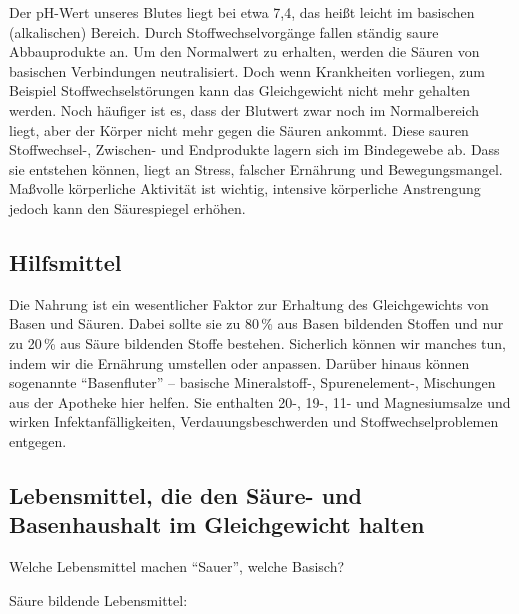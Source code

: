 Der pH-Wert unseres Blutes liegt bei etwa 7,4, das heißt leicht im
 basischen (alkalischen) Bereich. Durch Stoffwechselvorgänge
 fallen ständig saure Abbauprodukte an. Um den Normalwert
 zu erhalten, werden die Säuren von basischen Verbindungen neutralisiert.
 Doch wenn Krankheiten vorliegen, zum Beispiel Stoffwechselstörungen kann das
 Gleichgewicht nicht mehr gehalten werden.
 Noch häufiger ist es, dass der Blutwert zwar noch
 im Normalbereich liegt, aber der Körper nicht mehr gegen
 die Säuren ankommt. Diese sauren Stoffwechsel-, Zwischen-
 und Endprodukte lagern sich im Bindegewebe ab. Dass sie
 entstehen können, liegt an Stress, falscher Ernährung und Bewegungsmangel.
 Maßvolle körperliche Aktivität ist wichtig,
 intensive körperliche Anstrengung jedoch kann den Säurespiegel erhöhen.

\subsection{Hilfsmittel}
Die Nahrung ist ein wesentlicher Faktor zur Erhaltung des
 Gleichgewichts von Basen und Säuren. Dabei sollte sie zu
 80\,\% aus Basen bildenden Stoffen und nur zu 20\,\% aus Säure bildenden Stoffe bestehen.
 Sicherlich können wir manches tun, indem wir die Ernährung umstellen oder anpassen.
 Darüber hinaus können sogenannte \enquote{Basenfluter} --  basische
 Mineralstoff-, Spurenelement-, Mischungen aus der Apotheke
 hier helfen. Sie enthalten \acl{20}-, \acl{19}-, \acl{11}- und
 Magnesiumsalze und wirken Infektanfälligkeiten, Verdauungsbeschwerden und Stoffwechselproblemen entgegen.

\subsection{Lebensmittel, die den Säure- und Basenhaushalt im Gleichgewicht halten}
Welche Lebensmittel machen \enquote{Sauer}, welche Basisch?
\begin{description}
   \item[Säure bildende Lebensmittel:]
\end{description}

